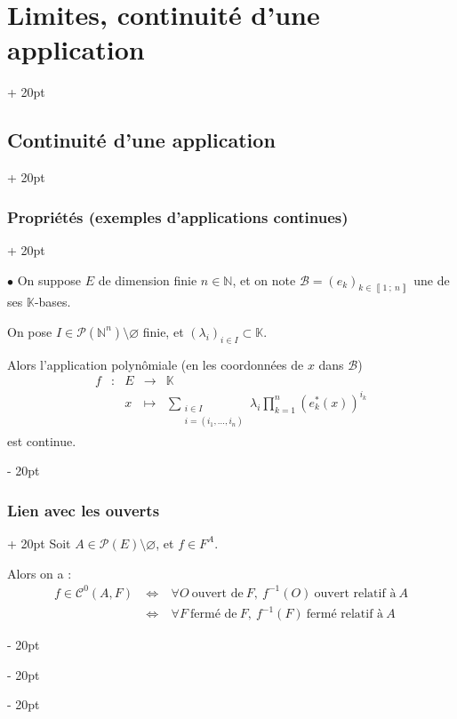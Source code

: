 \documentclass[a4paper, 12pt, twoside]{article}
\newcommand{\N}{\mathbb{N}} %
\newcommand{\K}{\mathbb K}
\newcommand{\nset}[2]{\left\llbracket #1\ ;\ #2 \right\rrbracket}
\newcommand{\lr}[1]{\left( #1 \right)}
\newcommand{\ssi}{\ \Leftrightarrow \ }
\newcommand{\ind}[1][20pt]{\advance\leftskip + #1}
\newcommand{\deind}[1][20pt]{\advance\leftskip - #1}
\newenvironment{indt}[2][20pt]{#2 \par \ind[#1]}{\par \deind} %
\begin{document}
\begin{indt}{\section{Limites, continuité d'une application}}
\begin{indt}{\subsection{Continuité d'une application}}
\begin{indt}{\subsubsection{Propriétés (exemples d'applications continues)}}
                \vspace{12pt}
                
                $\bullet$ On suppose $E$ de dimension finie $n \in \N$, et on note $\mathcal B = \lr{e_k}_{k \in \nset 1 n}$ une de ses $\K$-bases.

                On pose $I \in \mathcal P(\N^n) \setminus \varnothing$ finie, et $\lr{\lambda_i}_{i \in I} \subset \K$.

                \vspace{6pt}
                
                Alors l'application polynômiale (en les coordonnées de $x$ dans $\mathcal B$)
                \[
                    \begin{array}{ccccl}
                        f & : & E & \longrightarrow & \K
                        \\
                          && x & \longmapsto &
                          \displaystyle
                          \sum_{\substack{i \in I \\ i = (i_1, \ldots, i_n)}} \lambda_i \prod_{k = 1}^n \lr{e_k^*(x)}^{i_k}
                    \end{array}
                \]
                est continue.
            \end{indt}

            \vspace{12pt}
            
            \begin{indt}{\subsubsection{Lien avec les ouverts}}
                Soit $A \in \mathcal P(E) \setminus \varnothing$, et $f \in F^A$.

                Alors on a :
                \[
                    \begin{array}{rcl}
                        f \in \mathcal C^0(A, F)
                        &\ssi&
                        \forall O\ \text{ouvert de}\ F,\
                        f^{-1}(O)\ \text{ouvert relatif à}\ A
                        \\
                        &\ssi&
                        \forall F\ \text{fermé de}\ F,\
                        f^{-1}(F)\ \text{fermé relatif à}\ A
                    \end{array}
                \]
            \end{indt}


\end{indt}
\end{indt}
\end{document}
